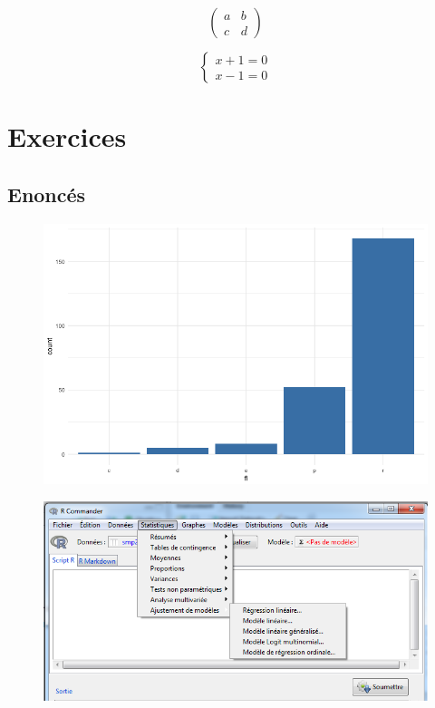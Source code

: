 








$$\begin{pmatrix}
a & b \\
c & d
\end{pmatrix}$$

$$\left
\{
\begin{array}{c}
x+1=0\\
x-1=0
\end{array}
\right.
$$

\section{Exercices}
\subsection{Enoncés}



\begin{figure}[H]\begin{center}\includegraphics[scale=1 ]{ilu/bg34.png}\end{center}\end{figure}

\begin{figure}[H]\begin{center}\includegraphics[scale=1 ]{ilu/bg.png}\end{center}\end{figure}




